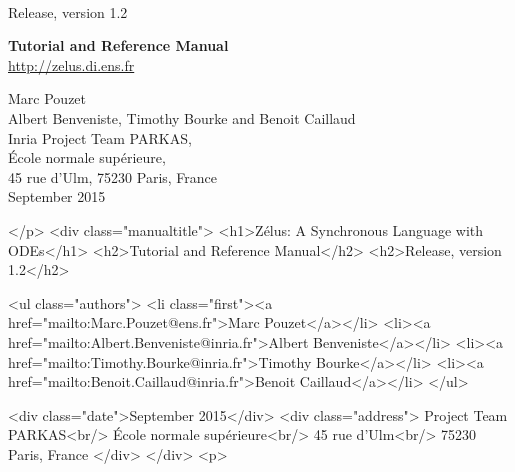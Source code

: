 \documentclass[11pt,titlepage,twoside]{report}
\begin{document}
\pagestyle{empty}

\vfill

\\[2ex]
{\Large Release, version 1.2}


\vspace{7cm}

\begin{center}
{\Huge \bf Tutorial and Reference Manual} \\

\vspace{1cm}
{\Large \url{http://zelus.di.ens.fr}}
\vspace{1.5cm}

{\Large Marc Pouzet} \\[2ex]
{\Large Albert Benveniste, Timothy Bourke and Benoit Caillaud} \\[4ex]
{\large Inria Project Team PARKAS, \\
\'Ecole normale sup\'erieure, \\ 45 rue d'Ulm,
75230 Paris, France} \\[2ex]
{\Large September 2015} \\

\end{center}
\begin{rawhtml}
</p>
<div class="manualtitle">
  <h1>Zélus: A Synchronous Language with ODEs</h1>
  <h2>Tutorial and Reference Manual</h2>
  <h2>Release, version 1.2</h2>

  <ul class="authors">
    <li class="first"><a href="mailto:Marc.Pouzet@ens.fr">Marc Pouzet</a></li>
    <li><a href="mailto:Albert.Benveniste@inria.fr">Albert Benveniste</a></li>
    <li><a href="mailto:Timothy.Bourke@inria.fr">Timothy Bourke</a></li>
    <li><a href="mailto:Benoit.Caillaud@inria.fr">Benoit Caillaud</a></li>
  </ul>

  <div class="date">September 2015</div>
  <div class="address">
    Project Team PARKAS<br/>
    École normale supérieure<br/>
    45 rue d'Ulm<br/>
    75230 Paris, France
  </div>
</div>
<p>
\end{rawhtml}
\end{document}
